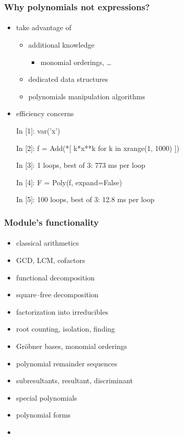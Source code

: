 \documentclass[10pt,polish]{beamer}
\begin{document}
\begin{frame}[fragile]
    \frametitle{Why polynomials not expressions?}
    \framesubtitle{}

    \begin{itemize}
        \item take advantage of
            \begin{itemize}
                \item additional knowledge
                    \begin{itemize}
                        \item monomial orderings, \ldots
                    \end{itemize}
                \item dedicated data structures
                \item polynomials manipulation algorithms
            \end{itemize}
        \pause
        \item efficiency concerns
            \begin{python}
In [1]: var('x')

In [2]: f = Add(*[ k*x**k for k in xrange(1, 1000) ])

In [3]: %
1 loops, best of 3: 773 ms per loop

In [4]: F = Poly(f, expand=False)

In [5]: %
100 loops, best of 3: 12.8 ms per loop
            \end{python}
    \end{itemize}
\end{frame}

\begin{frame}[fragile]
    \frametitle{Module's functionality}
    \framesubtitle{}

    \begin{itemize}
        \item classical arithmetics
        \item GCD, LCM, cofactors
        \item functional decomposition
        \item square--free decomposition
        \item factorization into irreducibles
        \item root counting, isolation, finding
        \item Gr\"{o}bner bases, monomial orderings
        \item polynomial remainder sequences
        \item subresultants, resultant, discriminant
        \item special polynomials
        \item polynomial forms
        \item \structure{\ldots}
    \end{itemize}
\end{frame}
\end{document}
